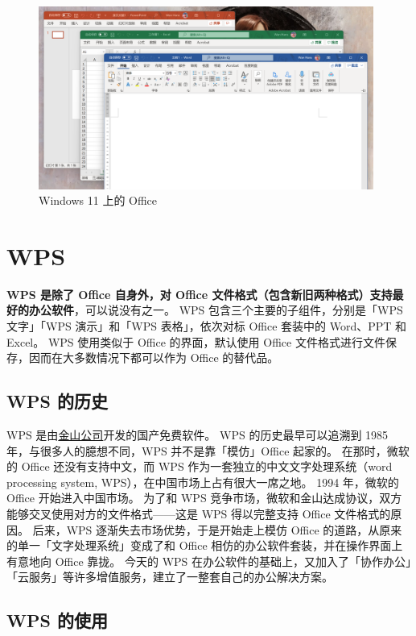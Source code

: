\begin{figure}[htb!]
  \centering
  \includegraphics[width=11cm]{assets/Office_on_Win_11.png}
  \caption{Windows 11 上的 Office}
  \label{Office_on_Win_11}
\end{figure}

\section{WPS}

\textbf{WPS 是除了 Office 自身外，对 Office 文件格式（包含新旧两种格式）支持最好的办公软件}，可以说没有之一。
WPS 包含三个主要的子组件，分别是「WPS 文字」「WPS 演示」和「WPS 表格」，依次对标 Office 套装中的 Word、PPT 和 Excel。
WPS 使用类似于 Office 的界面，默认使用 Office 文件格式进行文件保存，因而在大多数情况下都可以作为 Office 的替代品。

\subsection{WPS 的历史}

WPS 是由\href{https://www.kingsoft.com/}{金山公司}开发的国产免费软件。
WPS 的历史最早可以追溯到 1985 年，与很多人的臆想不同，WPS 并不是靠「模仿」Office 起家的。
在那时，微软的 Office 还没有支持中文，而 WPS 作为一套独立的中文文字处理系统（word processing system, WPS），在中国市场上占有很大一席之地。
1994 年，微软的 Office 开始进入中国市场。
为了和 WPS 竞争市场，微软和金山达成协议，双方能够交叉使用对方的文件格式——这是 WPS 得以完整支持 Office 文件格式的原因。
后来，WPS 逐渐失去市场优势，于是开始走上模仿 Office 的道路，从原来的单一「文字处理系统」变成了和 Office 相仿的办公软件套装，并在操作界面上有意地向 Office 靠拢。
今天的 WPS 在办公软件的基础上，又加入了「协作办公」「云服务」等许多增值服务，建立了一整套自己的办公解决方案。

\subsection{WPS 的使用}

